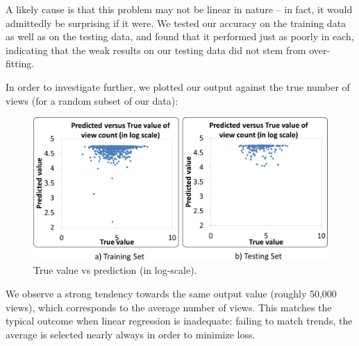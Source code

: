 	A likely cause is that this problem may not be linear in nature -- in fact, it would admittedly be surprising if it were.  We tested our accuracy on the training data as well as on the testing data, and found that it performed just as poorly in each, indicating that the weak results on our testing data did not stem from over-fitting.
	
	In order to investigate further, we plotted our output against the true number of views (for a random subset of our data):

	\begin{figure}[!h]
		\begin{center}
			\includegraphics[width=.75\textwidth,clip]{regression.pdf}
		\end{center}
		\caption{True value vs prediction (in log-scale).}
		\label{fig:trainingTrueVsPredicted}
	\end{figure}
		
	We observe a strong tendency towards the same output value (roughly 50,000 views), which corresponds to the average number of views.  This matches the typical outcome when linear regression is inadequate: failing to match trends, the average is selected nearly always in order to minimize loss.
